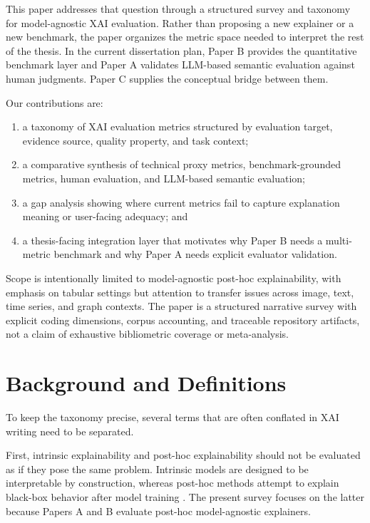 \documentclass[twoside,11pt]{article}
\begin{document}
This paper addresses that question through a structured survey and
taxonomy for model-agnostic XAI evaluation. Rather than proposing a new
explainer or a new benchmark, the paper organizes the metric space
needed to interpret the rest of the thesis. In the current dissertation
plan, Paper B provides the quantitative benchmark layer and Paper A
validates LLM-based semantic evaluation against human judgments. Paper C
supplies the conceptual bridge between them.

Our contributions are:
\begin{enumerate}[leftmargin=*]
\item a taxonomy of XAI evaluation metrics structured by evaluation
target, evidence source, quality property, and task context;
\item a comparative synthesis of technical proxy metrics,
benchmark-grounded metrics, human evaluation, and LLM-based semantic
evaluation;
\item a gap analysis showing where current metrics fail to capture
explanation meaning or user-facing adequacy; and
\item a thesis-facing integration layer that motivates why Paper B needs
a multi-metric benchmark and why Paper A needs explicit evaluator
validation.
\end{enumerate}

Scope is intentionally limited to model-agnostic post-hoc
explainability, with emphasis on tabular settings but attention to
transfer issues across image, text, time series, and graph contexts.
The paper is a structured narrative survey with explicit coding
dimensions, corpus accounting, and traceable repository artifacts, not a
claim of exhaustive bibliometric coverage or meta-analysis.

\section{Background and Definitions}

To keep the taxonomy precise, several terms that are often conflated in
XAI writing need to be separated.

First, intrinsic explainability and post-hoc explainability should not
be evaluated as if they pose the same problem. Intrinsic models are
designed to be interpretable by construction, whereas post-hoc methods
attempt to explain black-box behavior after model training
\citep{rudin2019stop,retzlaff2024posthoc}. The present survey focuses on
the latter because Papers A and B evaluate post-hoc model-agnostic
explainers.
\end{document}
